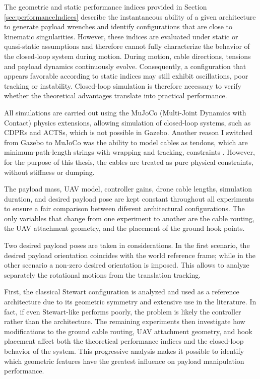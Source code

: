 The geometric and static performance indices provided in Section \ref{sec:performanceIndices} describe the instantaneous ability of a given architecture to generate payload wrenches and identify configurations that are close to kinematic singularities. However, these indices are evaluated under static or quasi-static assumptions and therefore cannot fully characterize the behavior of the closed-loop system during motion. During motion, cable directions, tensions and payload dynamics continuously evolve. Consequently, a configuration that appears favorable according to static indices may still exhibit oscillations, poor tracking or instability. Closed-loop simulation is therefore necessary to verify whether the theoretical advantages translate into practical performance.

All simulations are carried out using the MuJoCo (Multi-Joint Dynamics with Contact) physics extensions, allowing simulation of closed-loop systems, such as CDPRs and ACTSs, which is not possible in Gazebo. Another reason I switched from Gazebo to MuJoCo was the ability to model cables as tendons, which are minimum-path-length strings with wrapping and tracking, constraints \cite{mujoco_docs_237}. However, for the purpose of this thesis, the cables are treated as pure physical constraints, without stiffness or dumping.

The payload mass, UAV model, controller gains, drone cable lengths, simulation duration, and desired payload pose are kept constant throughout all experiments to ensure a fair comparison between diferent architectural configurations. The only variables that change from one experiment to another are the cable routing, the UAV attachment geometry, and the placement of the ground hook points.

Two desired payload poses are taken in considerations. In the first scenario, the desired payload orientation coincides with the world reference frame; while in the other scenario a non-zero desired orientation is imposed. This allows to analyze separately the rotational motions from the translation tracking.

First, the classical Stewart configuration is analyzed and used as a reference architecture due to its geometric symmetry and extensive use in the literature. In fact, if even Stewart-like performs poorly, the problem is likely the controller rather than the architecture. The remaining experiments then investigate how modifications to the ground cable routing, UAV attachment geometry, and hook placement affect both the theoretical performance indices and the closed-loop behavior of the system. This progressive analysis makes it possible to identify which geometric features have the greatest influence on payload manipulation performance.

